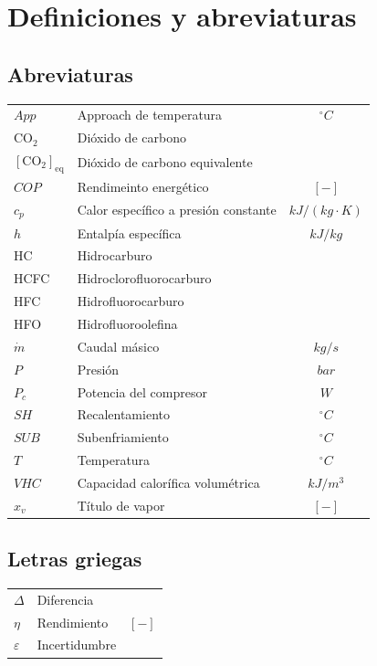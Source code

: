 \documentclass[../main.tex]{subfiles}
\begin{document}
\section{Definiciones y abreviaturas}

\subsection*{Abreviaturas}



\begin{tabularx}{\textwidth}{@{}l X c@{}}
$App$ & Approach de temperatura & $^\circ C$ \\
$\mathrm{CO_2}$ & Dióxido de carbono &  \\
$\left[\mathrm{CO_2}\right]_{\mathrm{eq}}$ & Dióxido de carbono equivalente &  \\
$COP$ & Rendimeinto energético & $[-]$ \\
$c_p$ & Calor específico a presión constante & $kJ/(kg\cdot K)$ \\
$h$ & Entalpía específica & $kJ/kg$ \\
HC & Hidrocarburo & \\
HCFC & Hidroclorofluorocarburo & \\
HFC & Hidrofluorocarburo & \\
HFO & Hidrofluoroolefina & \\
$\dot{m}$ & Caudal másico & $kg/s$ \\
$P$ & Presión & $bar$ \\
$P_{c}$ & Potencia del compresor & $W$ \\
$SH$ & Recalentamiento & $^\circ C$ \\
$SUB$ & Subenfriamiento & $^\circ C$ \\
$T$ & Temperatura & $^\circ C$ \\
$VHC$ & Capacidad calorífica volumétrica & $kJ/m^3$ \\
$x_v$ & Título de vapor & $[-]$ \\
\end{tabularx}


\vspace{2em}

\subsection*{Letras griegas}

\begin{tabularx}{\textwidth}{@{}l X c@{}}
$\Delta$ & Diferencia &  \\
$\eta$ & Rendimiento & $[-]$ \\
$\varepsilon$ & Incertidumbre &  \\
\end{tabularx}
\end{document}

